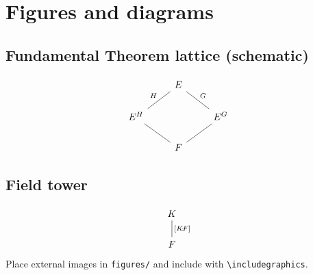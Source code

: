 \section{Figures and diagrams}

\subsection{Fundamental Theorem lattice (schematic)}
\[
\begin{tikzcd}
& E \arrow[dash]{dl}[swap]{H} \arrow[dash]{dr}{G} & \\
E^{H} \arrow[dash]{dr} & & E^{G} \arrow[dash]{dl} \\
& F &
\end{tikzcd}
\]

\subsection{Field tower}
\[
\begin{tikzcd}
K \arrow[dash]{d}{[K\!:\!F]} \\
F
\end{tikzcd}
\]
Place external images in \texttt{figures/} and include with \verb|\includegraphics|.
